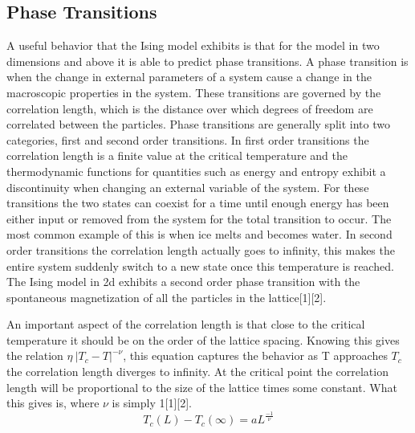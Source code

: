 \documentclass[12pt,righttag]{article}
\begin{document}
\subsection{Phase Transitions}
A useful behavior that the Ising model exhibits is that for the model in two dimensions and above it is able to predict phase transitions. A phase transition is when the change in external parameters of a system cause a change in the macroscopic properties in the system. These transitions are governed by the correlation length, which is the distance over which degrees of freedom are correlated between the particles. Phase transitions are generally split into two categories, first and second order transitions. In first order transitions the correlation length is a finite value at the critical temperature and the thermodynamic functions for quantities such as energy and entropy exhibit a discontinuity when changing an external variable of the system. For these transitions the two states can coexist for a time until enough energy has been either input or removed from the system for the total transition to occur. The most common example of this is when ice melts and becomes water. In second order transitions the correlation length actually goes to infinity, this makes the entire system suddenly switch to a new state once this temperature is reached. The Ising model in 2d exhibits a second order phase transition with the spontaneous magnetization of all the particles in the lattice[1][2].

An important aspect of the correlation length is that close to the critical temperature it should be on the order of the lattice spacing. Knowing this gives the relation $\eta ~|T_c-T|^{-\nu}$, this equation captures the behavior as T approaches $T_c$ the correlation length diverges to infinity. At the critical point the correlation length will be proportional to the size of the lattice times some constant. What this gives is, where $\nu$ is simply 1[1][2].
\[T_c(L)-T_c(\infty)=aL^{\frac{-1}{\nu}}\]


 
\end{document}
